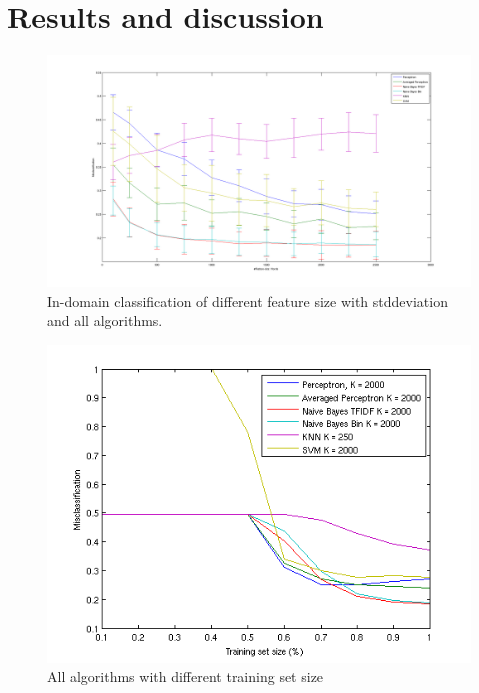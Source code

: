\chapter{Results and discussion}

\begin{figure}[H]
\centering
\includegraphics[scale = 0.2]{fig/featuresize_plot_snowball_unigram.png}
\caption{In-domain classification of different feature size with stddeviation and all algorithms.}
\label{fig:trainingsize}
\end{figure} 

\begin{figure}[H]
\centering
\includegraphics[scale = 0.7]{fig/training-size.png}
\caption{All algorithms with different training set size}
\label{fig:trainingsize}
\end{figure} 
